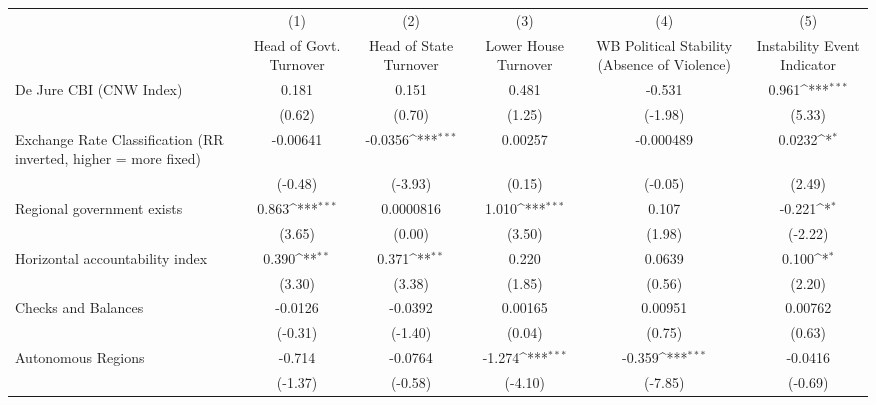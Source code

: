 {
\def\sym#1{\ifmmode^{#1}\else\(^{#1}\)\fi}
\begin{tabular*}{\linewidth}{@{\hskip\tabcolsep\extracolsep\fill}l*{5}{c}}
\hline\hline
                &\multicolumn{1}{c}{(1)}&\multicolumn{1}{c}{(2)}&\multicolumn{1}{c}{(3)}&\multicolumn{1}{c}{(4)}&\multicolumn{1}{c}{(5)}\\
                &\multicolumn{1}{c}{Head of Govt. Turnover}&\multicolumn{1}{c}{Head of State Turnover}&\multicolumn{1}{c}{Lower House Turnover}&\multicolumn{1}{c}{WB Political Stability (Absence of Violence)}&\multicolumn{1}{c}{Instability Event Indicator}\\
\hline
De Jure CBI (CNW Index)&    0.181         &    0.151         &    0.481         &   -0.531         &    0.961\sym{***}\\
                &   (0.62)         &   (0.70)         &   (1.25)         &  (-1.98)         &   (5.33)         \\
[1em]
Exchange Rate Classification (RR inverted, higher = more fixed)& -0.00641         &  -0.0356\sym{***}&  0.00257         &-0.000489         &   0.0232\sym{*}  \\
                &  (-0.48)         &  (-3.93)         &   (0.15)         &  (-0.05)         &   (2.49)         \\
[1em]
Regional government exists   &    0.863\sym{***}&0.0000816         &    1.010\sym{***}&    0.107         &   -0.221\sym{*}  \\
                &   (3.65)         &   (0.00)         &   (3.50)         &   (1.98)         &  (-2.22)         \\
[1em]
Horizontal accountability index&    0.390\sym{**} &    0.371\sym{**} &    0.220         &   0.0639         &    0.100\sym{*}  \\
                &   (3.30)         &   (3.38)         &   (1.85)         &   (0.56)         &   (2.20)         \\
[1em]
Checks and Balances&  -0.0126         &  -0.0392         &  0.00165         &  0.00951         &  0.00762         \\
                &  (-0.31)         &  (-1.40)         &   (0.04)         &   (0.75)         &   (0.63)         \\
[1em]
Autonomous Regions&   -0.714         &  -0.0764         &   -1.274\sym{***}&   -0.359\sym{***}&  -0.0416         \\
                &  (-1.37)         &  (-0.58)         &  (-4.10)         &  (-7.85)         &  (-0.69)         \\

\end{tabular*}}
